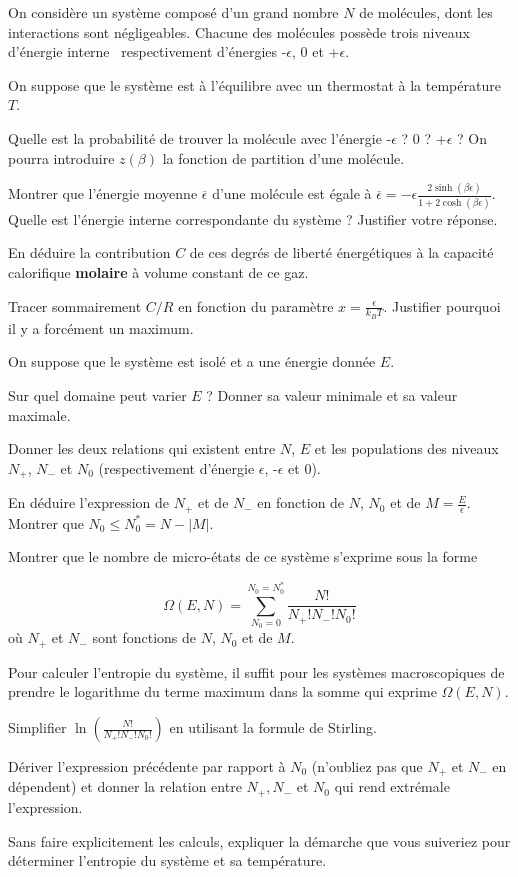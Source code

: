 On considère un système composé d'un grand nombre $N$ de molécules, dont les interactions sont négligeables. Chacune des molécules possède trois niveaux d'énergie \og interne \fg \, respectivement d'énergies -$\epsilon$, 0 et  +$\epsilon$. 



 On suppose que le système est à l'équilibre avec un thermostat à la température $T$.
 
\question
Quelle est la probabilité de trouver la molécule avec l'énergie -$\epsilon$ ? 0 ? +$\epsilon$ ? On pourra introduire $z(\beta)$ la fonction de partition d'une molécule.

\question
Montrer que l'énergie  moyenne $\overline{\epsilon}$ d'une molécule est égale à $\overline{\epsilon}=- \epsilon \frac{2 \sinh (\beta \epsilon)}{1+2\cosh (\beta \epsilon)}$. Quelle est l'énergie interne correspondante du système  ? Justifier votre réponse.

\question
En déduire la contribution $C$ de ces degrés de liberté énergétiques à la capacité calorifique \textbf{molaire} à volume constant de ce gaz.

\question
Tracer sommairement $C/R$ en fonction du paramètre $x=\frac{\epsilon}{k_BT}$. Justifier pourquoi il y a forcément un maximum.


On suppose que le système est isolé et a une énergie donnée $E$.

\question Sur quel domaine peut varier $E$ ? Donner sa valeur minimale et sa valeur maximale.

\question Donner les deux relations qui existent entre $N$, $E$ et les populations des niveaux $N_{+}$, $N_{-}$ et $N_{0}$ (respectivement d'énergie $\epsilon$, -$\epsilon$ et 0).

\question En déduire l'expression de $N_{+}$ et de $N_{-}$ en fonction de $N$, $N_{0}$ et de $M=\frac{E}{\epsilon}$. Montrer que $N_0 \le N_0^*=N-|M|$.

\question Montrer que le nombre de micro-états de ce système s'exprime sous la forme

$$
\Omega(E,N)=\sum_{N_0=0}^{N_0=N_0^*} \frac{N!}{N_{+}!N_{-}!N_0!}
$$
où $N_{+}$ et $N_{-}$ sont fonctions de $N$, $N_{0}$ et de $M$.


Pour calculer l'entropie du système, il suffit pour les systèmes macroscopiques de prendre le logarithme du terme maximum dans la somme qui exprime $\Omega(E,N)$.

\question Simplifier $\ln (\frac{N!}{N_{+}!N_{-}!N_0!} )$ en utilisant la formule de Stirling.

\question Dériver l'expression précédente par rapport à $N_0$ (n'oubliez pas que $N_{+}$ et $N_{-}$ en dépendent) et donner la relation entre $N_{+}, N_{-}$ et $N_0$ qui rend extrémale l'expression.

\question Sans faire explicitement les calculs, expliquer la démarche que vous suiveriez pour déterminer l'entropie du système et sa température. 
